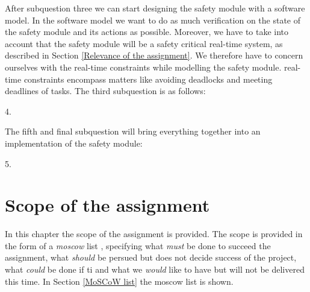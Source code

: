 \documentclass[12pt]{scrreprt}
\begin{document}
After subquestion three we can start designing the safety module with a software model. In the software model we want to do as much verification on the state of the safety module and its actions as possible. Moreover, we have to take into account that the safety module will be a safety critical real-time system, as described in Section \ref{Relevance of the assignment}.
We therefore have to concern ourselves with the real-time constraints while modelling the safety module. real-time constraints encompass matters like avoiding deadlocks and meeting deadlines of tasks. The third subquestion is as follows:

\begin{flushleft}
4. \textit{\sqfour}
\end{flushleft}

The fifth and final subquestion will bring everything together into an implementation of the safety module:

\begin{flushleft}
5. \textit{\sqfive}
\end{flushleft}


\section{Scope of the assignment}
\label{Scope of the assignment}




In this chapter the scope of the assignment is provided. The scope is provided in the form of a \textit{moscow} list \cite{moscow}, specifying what \textit{must} be done to succeed the assignment, what \textit{should} be persued but does not decide success of the project, what \textit{could} be done if ti and what we \textit{would} like to have but will not be delivered this time. In Section \ref{MoSCoW list} the moscow list is shown.
\end{document}
